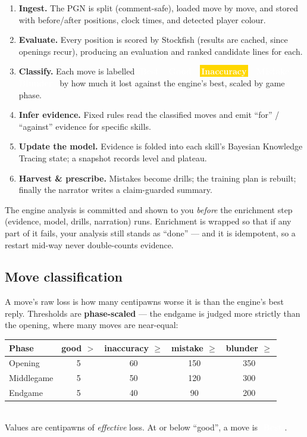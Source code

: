 \documentclass[11pt]{article}
\newcommand{\chip}[2]{\,\colorbox{#1}{\textcolor{white}{\sffamily\bfseries\footnotesize\,#2\,}}\,}
\newcommand{\best}{\chip{forestlt}{Best}}
\newcommand{\good}{\chip{forest}{Good}}
\newcommand{\inacc}{\chip{gold}{Inaccuracy}}
\newcommand{\mistake}{\chip{walnutmid}{Mistake}}
\newcommand{\blun}{\chip{blunder}{Blunder}}
\begin{document}
\begin{enumerate}[leftmargin=1.4em, itemsep=2pt]
  \item \textbf{Ingest.} The PGN is split (comment-safe), loaded move by move,
  and stored with before/after positions, clock times, and detected player
  colour.
  \item \textbf{Evaluate.} Every position is scored by Stockfish (results are
  cached, since openings recur), producing an evaluation and ranked candidate
  lines for each.
  \item \textbf{Classify.} Each move is labelled \best\ \good\ \inacc\ \mistake\ \blun\
  by how much it lost against the engine's best, scaled by game phase.
  \item \textbf{Infer evidence.} Fixed rules read the classified moves and emit
  ``for'' / ``against'' evidence for specific skills.
  \item \textbf{Update the model.} Evidence is folded into each skill's
  Bayesian Knowledge Tracing state; a snapshot records level and plateau.
  \item \textbf{Harvest \& prescribe.} Mistakes become drills; the training
  plan is rebuilt; finally the narrator writes a claim-guarded summary.
\end{enumerate}

\begin{notebox}
The engine analysis is committed and shown to you \emph{before} the enrichment
step (evidence, model, drills, narration) runs. Enrichment is wrapped so that
if any part of it fails, your analysis still stands as ``done'' --- and it is
idempotent, so a restart mid-way never double-counts evidence.
\end{notebox}

\subsection{Move classification}

A move's raw loss is how many centipawns worse it is than the engine's best
reply. Thresholds are \textbf{phase-scaled} --- the endgame is judged more
strictly than the opening, where many moves are near-equal:

\begin{center}
\tabnum
\begin{tabularx}{\linewidth}{@{}l c c c c@{}}
\toprule
\textbf{Phase} & \textbf{good $>$} & \textbf{inaccuracy $\geq$} & \textbf{mistake $\geq$} & \textbf{blunder $\geq$} \\
\midrule
Opening & 5 & 60 & 150 & 350 \\
Middlegame & 5 & 50 & 120 & 300 \\
Endgame & 5 & 40 & 90 & 200 \\
\bottomrule
\end{tabularx}\\[4pt]
{\footnotesize\color{slate}Values are centipawns of \emph{effective} loss. At or below ``good'', a move is \best.}
\end{center}
\end{document}
